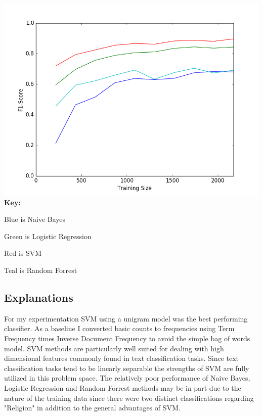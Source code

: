 \documentclass[11pt, oneside]{article}   	%
\begin{document}
\begin{center}
\includegraphics[width=16cm]{LR_comparison}
\textbf{Key:}

Blue is Naive Bayes

Green is Logistic Regression

Red is SVM

Teal is Random Forrest

\end{center}
\newpage

\subsection{Explanations}

For my experimentation SVM using a unigram model was the best performing classifier.  As a baseline I converted basic counts to frequencies using Term Frequency times Inverse Document Frequency to avoid the simple bag of words model.  SVM methods are particularly well suited for dealing with high dimensional features commonly found in text classification tasks.  Since text classification tasks tend to be linearly separable the strengths of SVM are fully utilized in this problem space.  The relatively poor performance of Naive Bayes, Logistic Regression and Random Forrest methods may be in part due to the nature of the training data since there were two distinct classifications regarding "Religion" in addition to the general advantages of SVM.
\end{document}
